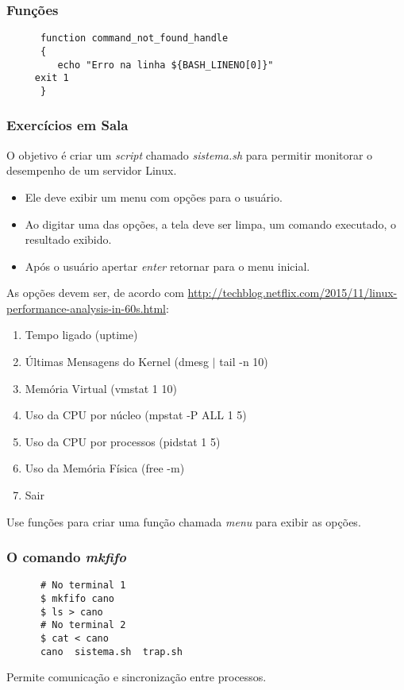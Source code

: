\documentclass{beamer}
\begin{document}

   \begin{frame}[fragile]
      \frametitle{Funções}
      \begin{verbatim}
      function command_not_found_handle
      {
         echo "Erro na linha ${BASH_LINENO[0]}"
	 exit 1
      }
      \end{verbatim}
\end{frame}

   \begin{frame}
      \frametitle{Exercícios em Sala}
      O objetivo é criar um \textit{script} chamado \textit{sistema.sh} para permitir monitorar o desempenho de um servidor Linux. 
     \begin{itemize} 
        \item Ele deve exibir um menu com opções para o usuário. 
        \item Ao digitar uma das opções, a tela deve ser limpa, um comando executado, o resultado exibido. 
        \item Após o usuário apertar \textit{enter} retornar para o menu inicial.
     \end{itemize}
     As opções devem ser, de acordo com \url{http://techblog.netflix.com/2015/11/linux-performance-analysis-in-60s.html}:
     \begin{enumerate}
        \item Tempo ligado (uptime)
	\item Últimas Mensagens do Kernel (dmesg $|$ tail -n 10)
	\item Memória Virtual (vmstat 1 10)
	\item Uso da CPU por núcleo (mpstat -P ALL 1 5)
	\item Uso da CPU por processos (pidstat 1 5)
	\item Uso da Memória Física (free -m)
	\item Sair
     \end{enumerate}
     Use funções para criar uma função chamada \textit{menu} para exibir as opções.
   \end{frame}

   \begin{frame}[fragile]
      \frametitle{O comando \textit{mkfifo}}
      \begin{verbatim}
      # No terminal 1
      $ mkfifo cano
      $ ls > cano
      # No terminal 2
      $ cat < cano
      cano  sistema.sh  trap.sh
      \end{verbatim}
      Permite comunicação e sincronização entre processos.
\end{frame}
\end{document}
